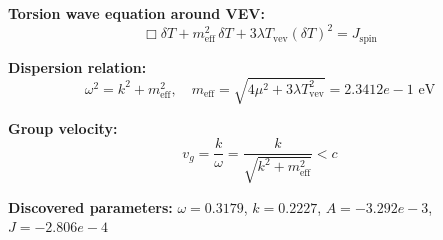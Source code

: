 
\textbf{Torsion wave equation around VEV:}
\begin{equation}
  \Box \delta T + m_{\text{eff}}^2 \, \delta T + 3\lambda T_{\text{vev}} (\delta T)^2 = J_{\text{spin}}
\end{equation}

\textbf{Dispersion relation:}
\begin{equation}
  \omega^2 = k^2 + m_{\text{eff}}^2, \quad
  m_{\text{eff}} = \sqrt{4\mu^2 + 3\lambda T_{\text{vev}}^2} = 2.3412e-1 \text{ eV}
\end{equation}

\textbf{Group velocity:}
\begin{equation}
  v_g = \frac{k}{\omega} = \frac{k}{\sqrt{k^2 + m_{\text{eff}}^2}} < c
\end{equation}

\textbf{Discovered parameters:}
$\omega = 0.3179$, \quad
$k = 0.2227$, \quad
$A = -3.292e-3$, \quad
$J = -2.806e-4$